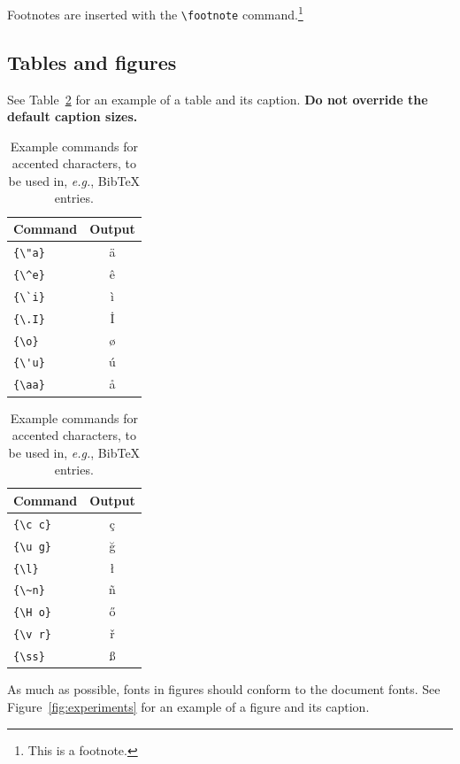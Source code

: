 \documentclass[11pt]{article}
\begin{document}
Footnotes are inserted with the \verb|\footnote| command.\footnote{This is a footnote.}

\subsection{Tables and figures}

See Table~\ref{tab:accents} for an example of a table and its caption.
\textbf{Do not override the default caption sizes.}

\begin{table}
  \centering
  \begin{tabular}{lc}
    \hline
    \textbf{Command} & \textbf{Output} \\
    \hline
    \verb|{\"a}|     & {\"a}           \\
    \verb|{\^e}|     & {\^e}           \\
    \verb|{\`i}|     & {\`i}           \\
    \verb|{\.I}|     & {\.I}           \\
    \verb|{\o}|      & {\o}            \\
    \verb|{\'u}|     & {\'u}           \\
    \verb|{\aa}|     & {\aa}           \\\hline
  \end{tabular}
  \begin{tabular}{lc}
    \hline
    \textbf{Command} & \textbf{Output} \\
    \hline
    \verb|{\c c}|    & {\c c}          \\
    \verb|{\u g}|    & {\u g}          \\
    \verb|{\l}|      & {\l}            \\
    \verb|{\~n}|     & {\~n}           \\
    \verb|{\H o}|    & {\H o}          \\
    \verb|{\v r}|    & {\v r}          \\
    \verb|{\ss}|     & {\ss}           \\
    \hline
  \end{tabular}
  \caption{Example commands for accented characters, to be used in, \emph{e.g.}, Bib\TeX{} entries.}
  \label{tab:accents}
\end{table}

As much as possible, fonts in figures should conform
to the document fonts. See Figure~\ref{fig:experiments} for an example of a figure and its caption.
\end{document}
